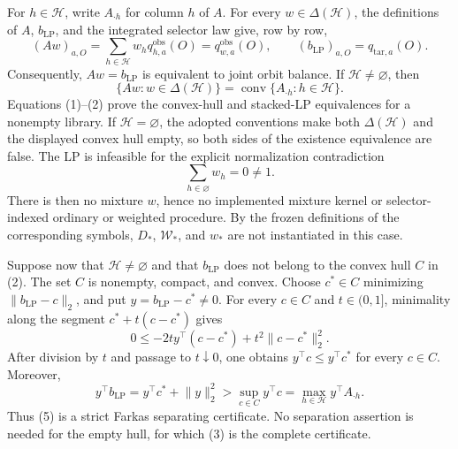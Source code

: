For \(h\in\mathcal H\), write \(A_{\cdot h}\) for column \(h\) of \(A\). For every \(w\in\Delta(\mathcal H)\), the definitions of \(A\), \(b_{\mathrm{LP}}\), and the integrated selector law give, row by row,
\[
(Aw)_{a,O}=\sum_{h\in\mathcal H}w_hq^{\mathrm{obs}}_{h,a}(O)=q^{\mathrm{obs}}_{w,a}(O),\qquad (b_{\mathrm{LP}})_{a,O}=q_{\mathrm{tar},a}(O).
\tag{1}
\]
Consequently, \(Aw=b_{\mathrm{LP}}\) is equivalent to joint orbit balance. If \(\mathcal H\ne\varnothing\), then
\[
\{Aw:w\in\Delta(\mathcal H)\}=\operatorname{conv}\{A_{\cdot h}:h\in\mathcal H\}.
\tag{2}
\]
Equations (1)--(2) prove the convex-hull and stacked-LP equivalences for a nonempty library. If \(\mathcal H=\varnothing\), the adopted conventions make both \(\Delta(\mathcal H)\) and the displayed convex hull empty, so both sides of the existence equivalence are false. The LP is infeasible for the explicit normalization contradiction
\[
\sum_{h\in\varnothing}w_h=0\ne1.
\tag{3}
\]
There is then no mixture \(w\), hence no implemented mixture kernel or selector-indexed ordinary or weighted procedure. By the frozen definitions of the corresponding symbols, \(D_*\), \(\mathcal W_*\), and \(w_*\) are not instantiated in this case.

Suppose now that \(\mathcal H\ne\varnothing\) and that \(b_{\mathrm{LP}}\) does not belong to the convex hull \(C\) in (2). The set \(C\) is nonempty, compact, and convex. Choose \(c^*\in C\) minimizing \(\lVert b_{\mathrm{LP}}-c\rVert_2\), and put \(y=b_{\mathrm{LP}}-c^*\ne0\). For every \(c\in C\) and \(t\in(0,1]\), minimality along the segment \(c^*+t(c-c^*)\) gives
\[
0\le -2t y^\top(c-c^*)+t^2\lVert c-c^*\rVert_2^2.
\tag{4}
\]
After division by \(t\) and passage to \(t\downarrow0\), one obtains \(y^\top c\le y^\top c^*\) for every \(c\in C\). Moreover,
\[
y^\top b_{\mathrm{LP}}=y^\top c^*+\lVert y\rVert_2^2>\sup_{c\in C}y^\top c=\max_{h\in\mathcal H}y^\top A_{\cdot h}.
\tag{5}
\]
Thus (5) is a strict Farkas separating certificate. No separation assertion is needed for the empty hull, for which (3) is the complete certificate.


